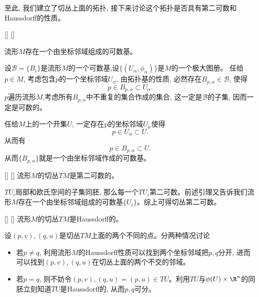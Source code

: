 \documentclass[UTF8]{ctexart}
\begin{document}
    至此, 我们建立了切丛上面的拓扑, 接下来讨论这个拓扑是否具有第二可数和Haussdorff的性质。
    
    \begin{lma}
        []
        {}
        []
        []

        流形$M$存在一个由坐标邻域组成的可数基。
    \end{lma}

    \begin{prf}
        
        
        
        

        设$\mathcal{B} = \{B_i\}$是流形$M$的一个可数基,设$\{(U_{\alpha}, \phi_{\alpha})\}$是$M$的一个极大图册。
        任给$p \in M$, 考虑包含$p$的一个坐标邻域$U_{\alpha}$, 由拓扑基的性质, 必然存在$B_{p,\alpha} \in \mathcal{B}$, 使得
        \[
            p \in B_{p,\alpha} \subset U_{\alpha}.
        \]
        $p$遍历流形$M$,考虑所有$B_{p,\alpha}$中不重复的集合作成的集合, 这一定是$\mathcal{B}$的子集, 因而一定是可数的。

        任给$M$上的一个开集$U$, 一定存在p的坐标邻域$U_{\alpha}$使得
        \[
            p \in U_{\alpha} \subset U.
        \]
        从而有
        \[
            p \in B_{p,\alpha} \subset U.
        \]
        从而$\{B_{p,\alpha}\}$就是一个由坐标邻域作成的可数基。
    \end{prf}

    \begin{ppt}
        []
        {}
        []
        []
        流形$M$的切丛$TM$是第二可数的。
    \end{ppt}

    \begin{prf}
        
        
        
        

        $T U_i$局部和欧氏空间的子集同胚, 那么每一个$T U_i$第二可数。前述引理又告诉我们流形$M$存在一个由坐标邻域组成的可数基$\{U_i\}$。综上可得切丛第二可数。
    \end{prf}

    \begin{ppt}
        []
        {}
        []
        []
        流形$M$的切丛$TM$是Haussdorff的。
    \end{ppt}

    \begin{prf}
        
        
        
        

        设$(p,v), (q,u)$是切丛$TM$上面的两个不同的点。分两种情况讨论
        \begin{itemize}
            \item 若$p \neq q$, 利用流形$M$的Haussdorff性质可以找到两个坐标邻域把$p,q$分开, 进而可以找到$(p,v), (q,u)$在切丛上面的两个不交的邻域。
            \item 若$p = q$, 则不妨令$(p,v), (q,u)=(p,u) \in TU$。利用$TU$与$\phi(U) \times \R^n$的同胚立刻知道$TU$是Haussdorff的, 从而$p, q$可分。
        \end{itemize}
    \end{prf}
\end{document}
